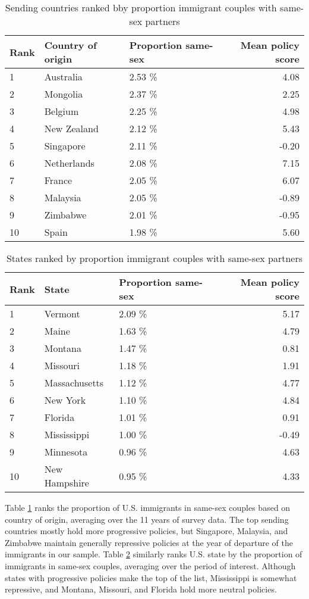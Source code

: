 \documentclass[
  11pt,
]{article}
\begin{document}
\begin{table}

\caption{\label{tab:country-tab}Sending countries ranked bby proportion immigrant couples with same-sex partners}
\centering
\begin{tabular}[t]{lllr}
\toprule
Rank & Country of origin & Proportion same-sex & Mean policy score\\
\midrule
1 & Australia & 2.53 \% & 4.08\\
2 & Mongolia & 2.37 \% & 2.25\\
3 & Belgium & 2.25 \% & 4.98\\
4 & New Zealand & 2.12 \% & 5.43\\
5 & Singapore & 2.11 \% & -0.20\\
6 & Netherlands & 2.08 \% & 7.15\\
7 & France & 2.05 \% & 6.07\\
8 & Malaysia & 2.05 \% & -0.89\\
9 & Zimbabwe & 2.01 \% & -0.95\\
10 & Spain & 1.98 \% & 5.60\\
\bottomrule
\end{tabular}
\end{table}

\begin{table}

\caption{\label{tab:state-tab}States ranked by proportion immigrant couples with same-sex partners}
\centering
\begin{tabular}[t]{lllr}
\toprule
Rank & State & Proportion same-sex & Mean policy score\\
\midrule
1 & Vermont & 2.09 \% & 5.17\\
2 & Maine & 1.63 \% & 4.79\\
3 & Montana & 1.47 \% & 0.81\\
4 & Missouri & 1.18 \% & 1.91\\
5 & Massachusetts & 1.12 \% & 4.77\\
6 & New York & 1.10 \% & 4.84\\
7 & Florida & 1.01 \% & 0.91\\
8 & Mississippi & 1.00 \% & -0.49\\
9 & Minnesota & 0.96 \% & 4.63\\
10 & New Hampshire & 0.95 \% & 4.33\\
\bottomrule
\end{tabular}
\end{table}

Table \ref{tab:country-tab} ranks the proportion of U.S. immigrants in same-sex couples based on country of origin, averaging over the 11 years of survey data. The top sending countries mostly hold more progressive policies, but Singapore, Malaysia, and Zimbabwe maintain generally repressive policies at the year of departure of the immigrants in our sample. Table \ref{tab:state-tab} similarly ranks U.S. state by the proportion of immigrants in same-sex couples, averaging over the period of interest. Although states with progressive policies make the top of the list, Mississippi is somewhat repressive, and Montana, Missouri, and Florida hold more neutral policies.
\end{document}

